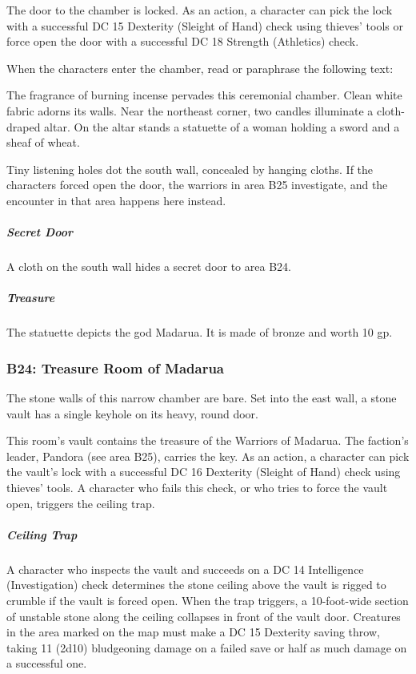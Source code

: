 \documentclass[10pt,a4paper,twoside,bg=print,twocolumn,openany,nodeprecatedcode]{dndbook}
\begin{document}
The door to the chamber is locked. As an action, a character can pick the lock with a successful DC 15 Dexterity (Sleight of Hand) check using thieves' tools or force open the door with a successful DC 18 Strength (Athletics) check.

When the characters enter the chamber, read or paraphrase the following text:

\begin{DndReadAloud}{}
The fragrance of burning incense pervades this ceremonial chamber. Clean white fabric adorns its walls. Near the northeast corner, two candles illuminate a cloth-draped altar. On the altar stands a statuette of a woman holding a sword and a sheaf of wheat.

\end{DndReadAloud}

Tiny listening holes dot the south wall, concealed by hanging cloths. If the characters forced open the door, the warriors in area B25 investigate, and the encounter in that area happens here instead.

\subparagraph{Secret Door}
A cloth on the south wall hides a secret door to area B24.

\subparagraph{Treasure}
The statuette depicts the god Madarua. It is made of bronze and worth 10 gp.

\subsubsection{B24: Treasure Room of Madarua}
\begin{DndReadAloud}{}
The stone walls of this narrow chamber are bare. Set into the east wall, a stone vault has a single keyhole on its heavy, round door.

\end{DndReadAloud}

This room's vault contains the treasure of the Warriors of Madarua. The faction's leader, Pandora (see area B25), carries the key. As an action, a character can pick the vault's lock with a successful DC 16 Dexterity (Sleight of Hand) check using thieves' tools. A character who fails this check, or who tries to force the vault open, triggers the ceiling trap.

\subparagraph{Ceiling Trap}
A character who inspects the vault and succeeds on a DC 14 Intelligence (Investigation) check determines the stone ceiling above the vault is rigged to crumble if the vault is forced open. When the trap triggers, a 10-foot-wide section of unstable stone along the ceiling collapses in front of the vault door. Creatures in the area marked on the map must make a DC 15 Dexterity saving throw, taking 11 (2d10) bludgeoning damage on a failed save or half as much damage on a successful one.
\end{document}
